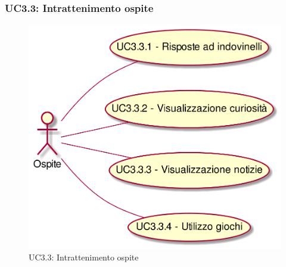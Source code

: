 \newpage\subsubsection{UC3.3: Intrattenimento ospite}
\label{UC3.3}
\begin{figure}[h]
\centering
\includegraphics[width=\textwidth,height=\textheight,keepaspectratio]{images/UseCaseUC33.png}
\caption{UC3.3: Intrattenimento ospite}
\end{figure}
